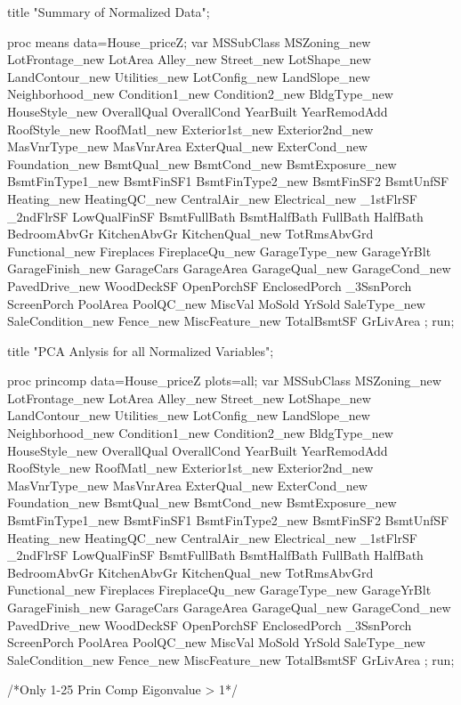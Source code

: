 title "Summary of Normalized Data";

proc means data=House_priceZ;
var MSSubClass		MSZoning_new	LotFrontage_new	LotArea				Alley_new
			Street_new		LotShape_new	LandContour_new	Utilities_new		LotConfig_new
			LandSlope_new	Neighborhood_new Condition1_new	Condition2_new		BldgType_new
			HouseStyle_new	OverallQual		OverallCond		YearBuilt			YearRemodAdd	
			RoofStyle_new	RoofMatl_new	Exterior1st_new	Exterior2nd_new		MasVnrType_new	
			MasVnrArea		ExterQual_new	ExterCond_new	Foundation_new		BsmtQual_new
			BsmtCond_new	BsmtExposure_new BsmtFinType1_new BsmtFinSF1		BsmtFinType2_new
			BsmtFinSF2		BsmtUnfSF		Heating_new		HeatingQC_new		CentralAir_new
			Electrical_new	_1stFlrSF		_2ndFlrSF		LowQualFinSF		BsmtFullBath
			BsmtHalfBath	FullBath		HalfBath		BedroomAbvGr		KitchenAbvGr
			KitchenQual_new	TotRmsAbvGrd	Functional_new	Fireplaces			FireplaceQu_new
			GarageType_new	GarageYrBlt		GarageFinish_new GarageCars			GarageArea
			GarageQual_new	GarageCond_new	PavedDrive_new	WoodDeckSF			OpenPorchSF
			EnclosedPorch	_3SsnPorch		ScreenPorch		PoolArea			PoolQC_new
			MiscVal			MoSold			YrSold			SaleType_new		SaleCondition_new	
			Fence_new		MiscFeature_new TotalBsmtSF		GrLivArea	;
run;

title "PCA Anlysis for all Normalized Variables";

proc princomp data=House_priceZ 
plots=all;
var MSSubClass		MSZoning_new	LotFrontage_new	LotArea				Alley_new
			Street_new		LotShape_new	LandContour_new	Utilities_new		LotConfig_new
			LandSlope_new	Neighborhood_new Condition1_new	Condition2_new		BldgType_new
			HouseStyle_new	OverallQual		OverallCond		YearBuilt			YearRemodAdd	
			RoofStyle_new	RoofMatl_new	Exterior1st_new	Exterior2nd_new		MasVnrType_new	
			MasVnrArea		ExterQual_new	ExterCond_new	Foundation_new		BsmtQual_new
			BsmtCond_new	BsmtExposure_new BsmtFinType1_new BsmtFinSF1		BsmtFinType2_new
			BsmtFinSF2		BsmtUnfSF		Heating_new		HeatingQC_new		CentralAir_new
			Electrical_new	_1stFlrSF		_2ndFlrSF		LowQualFinSF		BsmtFullBath
			BsmtHalfBath	FullBath		HalfBath		BedroomAbvGr		KitchenAbvGr
			KitchenQual_new	TotRmsAbvGrd	Functional_new	Fireplaces			FireplaceQu_new
			GarageType_new	GarageYrBlt		GarageFinish_new GarageCars			GarageArea
			GarageQual_new	GarageCond_new	PavedDrive_new	WoodDeckSF			OpenPorchSF
			EnclosedPorch	_3SsnPorch		ScreenPorch		PoolArea			PoolQC_new
			MiscVal			MoSold			YrSold			SaleType_new		SaleCondition_new	
			Fence_new		MiscFeature_new TotalBsmtSF		GrLivArea			;
run;

/*Only 1-25 Prin Comp Eigonvalue > 1*/

